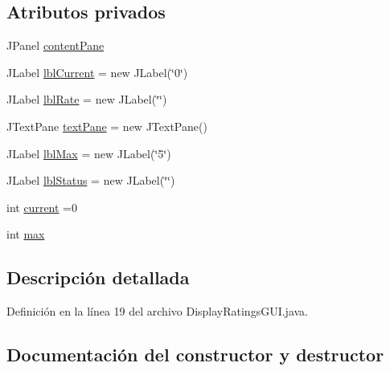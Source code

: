 \subsection*{Atributos privados}
\begin{DoxyCompactItemize}
\item 
J\+Panel \mbox{\hyperlink{classgui_1_1_display_ratings_g_u_i_abb465b2b4cdb54123c4b0521838a6d26}{content\+Pane}}
\item 
J\+Label \mbox{\hyperlink{classgui_1_1_display_ratings_g_u_i_a4a6b949bc2f095f92c35e11a9b253605}{lbl\+Current}} = new J\+Label(\char`\"{}0\char`\"{})
\item 
J\+Label \mbox{\hyperlink{classgui_1_1_display_ratings_g_u_i_aa8eadb796ab524b992c52893d5aeaf15}{lbl\+Rate}} = new J\+Label(\char`\"{}\char`\"{})
\item 
J\+Text\+Pane \mbox{\hyperlink{classgui_1_1_display_ratings_g_u_i_ab2eff35a0e0def7edb919b19c3479495}{text\+Pane}} = new J\+Text\+Pane()
\item 
J\+Label \mbox{\hyperlink{classgui_1_1_display_ratings_g_u_i_a46c665c4d59be0fc85e5600d949c0c38}{lbl\+Max}} = new J\+Label(\char`\"{}5\char`\"{})
\item 
J\+Label \mbox{\hyperlink{classgui_1_1_display_ratings_g_u_i_af22d979904bed66577197633479efb90}{lbl\+Status}} = new J\+Label(\char`\"{}\char`\"{})
\item 
int \mbox{\hyperlink{classgui_1_1_display_ratings_g_u_i_a008e78563513fe1de284f5012b822b6c}{current}} =0
\item 
int \mbox{\hyperlink{classgui_1_1_display_ratings_g_u_i_a4c70177d900d213655a2687879b6b269}{max}}
\end{DoxyCompactItemize}


\subsection{Descripción detallada}


Definición en la línea 19 del archivo Display\+Ratings\+G\+U\+I.\+java.



\subsection{Documentación del constructor y destructor}
\mbox{\label{classgui_1_1_display_ratings_g_u_i_a5cd86dd9480c8d64c1d2865a8c4e3af5}} 
